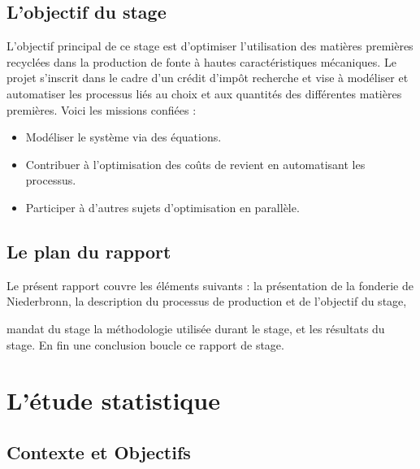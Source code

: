 \documentclass[12pt]{article}
\begin{document}
\subsection{L'objectif du stage }


L’objectif principal de ce stage est d’optimiser l’utilisation des matières 
premières recyclées dans la production de fonte à hautes caractéristiques 
mécaniques. Le projet s’inscrit dans le cadre d’un crédit d’impôt recherche 
et vise à modéliser et automatiser les processus liés au choix et aux 
quantités des différentes matières premières. Voici les missions confiées :

\begin{itemize}
    \item Modéliser le système via des équations.
    \item Contribuer à l’optimisation des coûts de revient en 
    automatisant les processus.
    \item Participer à d’autres sujets d’optimisation en parallèle.
\end{itemize}


\subsection{Le plan du rapport}

Le présent rapport couvre les éléments suivants : la présentation de 
la fonderie de Niederbronn, la description du processus 
de production et de l'objectif du stage, 

mandat du stage la méthodologie utilisée durant le stage, et les résultats du stage. En
fin une conclusion boucle ce rapport de stage.










\section{L'étude statistique}


\subsection{Contexte et Objectifs}
\end{document}
